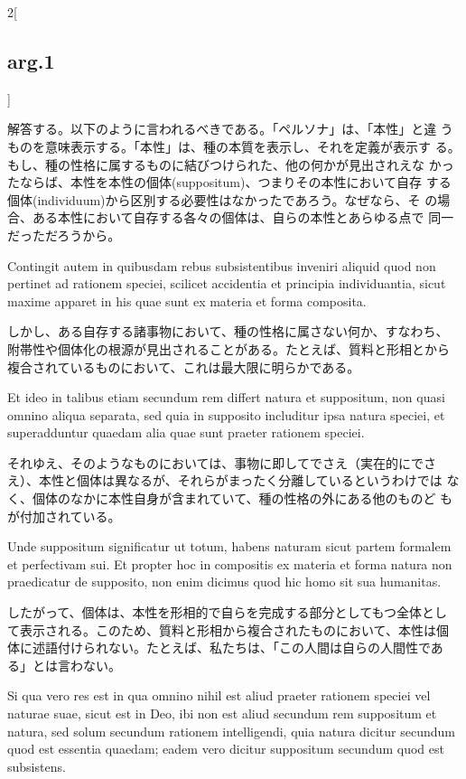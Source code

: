 \documentclass[paper=a4paper,fontsize=10pt,jafontsize=9pt,titlepage]{jlreq}
\begin{document}
\begin{paracol}{2}[\subsection{arg.1}]
\switchcolumn

解答する。以下のように言われるべきである。「ペルソナ」は、「本性」と違
うものを意味表示する。「本性」は、種の本質を表示し、それを定義が表示す
る。もし、種の性格に属するものに結びつけられた、他の何かが見出されえな
かったならば、本性を本性の個体(suppositum)、つまりその本性において自存
する個体(individuum)から区別する必要性はなかったであろう。なぜなら、そ
の場合、ある本性において自存する各々の個体は、自らの本性とあらゆる点で
同一だっただろうから。

\switchcolumn*

Contingit autem in quibusdam rebus subsistentibus inveniri aliquid
quod non pertinet ad rationem speciei, scilicet accidentia et
principia individuantia, sicut maxime apparet in his quae sunt ex
materia et forma composita.

\switchcolumn

しかし、ある自存する諸事物において、種の性格に属さない何か、すなわち、
附帯性や個体化の根源が見出されることがある。たとえば、質料と形相とから
複合されているものにおいて、これは最大限に明らかである。

\switchcolumn*

Et ideo in talibus etiam secundum rem differt natura et suppositum,
non quasi omnino aliqua separata, sed quia in supposito includitur
ipsa natura speciei, et superadduntur quaedam alia quae sunt praeter
rationem speciei.

\switchcolumn

それゆえ、そのようなものにおいては、事物に即してでさえ（実在的にでさ
え）、本性と個体は異なるが、それらがまったく分離しているというわけでは
なく、個体のなかに本性自身が含まれていて、種の性格の外にある他のものど
もが付加されている。

\switchcolumn*

Unde suppositum significatur ut totum, habens naturam sicut partem
formalem et perfectivam sui. Et propter hoc in compositis ex materia
et forma natura non praedicatur de supposito, non enim dicimus quod
hic homo sit sua humanitas.

\switchcolumn

したがって、個体は、本性を形相的で自らを完成する部分としてもつ全体とし
て表示される。このため、質料と形相から複合されたものにおいて、本性は個
体に述語付けられない。たとえば、私たちは、「この人間は自らの人間性であ
る」とは言わない。

\switchcolumn*

Si qua vero res est in qua omnino nihil est aliud praeter rationem
speciei vel naturae suae, sicut est in Deo, ibi non est aliud secundum
rem suppositum et natura, sed solum secundum rationem intelligendi,
quia natura dicitur secundum quod est essentia quaedam; eadem vero
dicitur suppositum secundum quod est subsistens.


\end{paracol}
\end{document}
